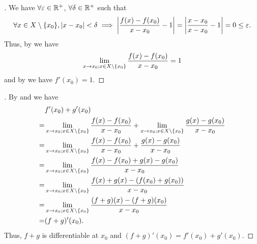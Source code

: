 \begin{proof}[]
  We have \(\forall \varepsilon \in \mathbb{R}^+\), \(\forall \delta \in \mathbb{R}^+\) such that
  \[
    \forall x \in X \setminus \set{x_0}, \abs{x - x_0} < \delta \implies \abs{\dfrac{f(x) - f(x_0)}{x - x_0} - 1} = \abs{\dfrac{x - x_0}{x - x_0} - 1} = 0 \leq \varepsilon.
  \]
  Thus, by  we have
  \[
    \lim_{x \to x_0 ; x \in X \setminus \left\lbrace x_0\right\rbrace} \dfrac{f(x) - f(x_0)}{x - x_0} = 1
  \]
  and by  we have \(f'(x_0) = 1\).
\end{proof}

\begin{proof}[]
  By  and  we have
  \begin{align*}
      & f'(x_0) + g'(x_0)                                                                                                                                             \\
    = & \lim_{x \to x_0 ; x \in X \setminus \left\lbrace x_0\right\rbrace} \dfrac{f(x) - f(x_0)}{x - x_0} + \lim_{x \to x_0 ; x \in X \setminus \left\lbrace x_0\right\rbrace} \dfrac{g(x) - g(x_0)}{x - x_0} \\
    = & \lim_{x \to x_0 ; x \in X \setminus \left\lbrace x_0\right\rbrace} \dfrac{f(x) - f(x_0)}{x - x_0} + \dfrac{g(x) - g(x_0)}{x - x_0}                                                \\
    = & \lim_{x \to x_0 ; x \in X \setminus \left\lbrace x_0\right\rbrace} \dfrac{f(x) - f(x_0) + g(x) - g(x_0)}{x - x_0}                                                                 \\
    = & \lim_{x \to x_0 ; x \in X \setminus \left\lbrace x_0\right\rbrace} \dfrac{f(x) + g(x) - (f(x_0) + g(x_0))}{x - x_0}                                                               \\
    = & \lim_{x \to x_0 ; x \in X \setminus \left\lbrace x_0\right\rbrace} \dfrac{(f + g)(x) - (f + g)(x_0)}{x - x_0}                                                                     \\
    = & (f + g)'(x_0).
  \end{align*}
  Thus, \(f + g\) is differentiable at \(x_0\) and \((f + g)'(x_0) = f'(x_0) + g'(x_0)\).
\end{proof}

